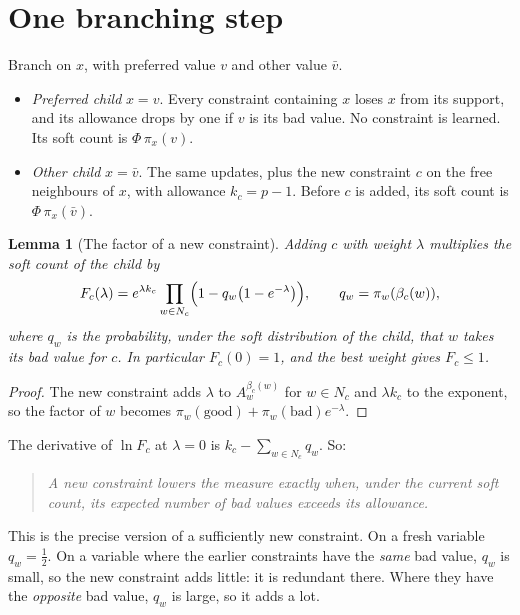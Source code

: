 \documentclass[11pt,a4paper]{article}
\newtheorem{lemma}{Lemma}
\theoremstyle{definition}
\begin{document}
\section{One branching step}

Branch on $x$, with preferred value $v$ and other value $\bar v$.
\begin{itemize}
 \item \emph{Preferred child} $x=v$. Every constraint containing $x$ loses
 $x$ from its support, and its allowance drops by one if $v$ is its bad
 value. No constraint is learned. Its soft count is $\Phi\,\pi_x(v)$.
 \item \emph{Other child} $x=\bar v$. The same updates, plus the new
 constraint $c$ on the free neighbours of $x$, with allowance $k_c=p-1$.
 Before $c$ is added, its soft count is $\Phi\,\pi_x(\bar v)$.
\end{itemize}

\begin{lemma}[The factor of a new constraint]\label{lem:factor}
Adding $c$ with weight $\lambda$ multiplies the soft count of the child by
\[
 F_c(\lambda)=e^{\lambda k_c}\prod_{w\in N_c}
 \Bigl(1-q_w\bigl(1-e^{-\lambda}\bigr)\Bigr),
 \qquad q_w=\pi_w(\beta_c(w)),
\]
where $q_w$ is the probability, under the soft distribution of the child,
that $w$ takes its bad value for $c$. In particular $F_c(0)=1$, and the best
weight gives $F_c\le1$.
\end{lemma}

\begin{proof}
The new constraint adds $\lambda$ to $A_w^{\beta_c(w)}$ for $w\in N_c$ and
$\lambda k_c$ to the exponent, so the factor of $w$ becomes
$\pi_w(\text{good})+\pi_w(\text{bad})e^{-\lambda}$.
\end{proof}

The derivative of $\ln F_c$ at $\lambda=0$ is $k_c-\sum_{w\in N_c}q_w$. So:

\begin{quote}
\emph{A new constraint lowers the measure exactly when, under the current soft
count, its expected number of bad values exceeds its allowance.}
\end{quote}

This is the precise version of a sufficiently new constraint. On a fresh
variable $q_w=\frac12$. On a variable where the earlier constraints have the
\emph{same} bad value, $q_w$ is small, so the new constraint adds little: it is
redundant there. Where they have the \emph{opposite} bad value, $q_w$ is
large, so it adds a lot.
\end{document}
